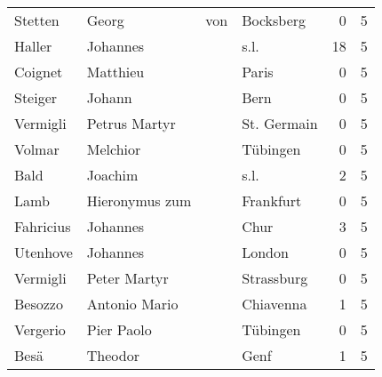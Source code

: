 \documentclass[10pt,a4paper,landscape]{article}
\begin{document}
\begin{longtable}{llllrr}
                  Stetten &                              Georg &         von &                                   Bocksberg &          0 &         5 \\
                   Haller &                           Johannes &             &                                        s.l. &         18 &         5 \\
                  Coignet &                           Matthieu &             &                                       Paris &          0 &         5 \\
                  Steiger &                             Johann &             &                                        Bern &          0 &         5 \\
                 Vermigli &                      Petrus Martyr &             &                                 St. Germain &          0 &         5 \\
                   Volmar &                           Melchior &             &                                    Tübingen &          0 &         5 \\
                     Bald &                            Joachim &             &                                        s.l. &          2 &         5 \\
                     Lamb &                     Hieronymus zum &             &                                   Frankfurt &          0 &         5 \\
                Fahricius &                           Johannes &             &                                        Chur &          3 &         5 \\
                 Utenhove &                           Johannes &             &                                      London &          0 &         5 \\
                 Vermigli &                       Peter Martyr &             &                                  Strassburg &          0 &         5 \\
                  Besozzo &                      Antonio Mario &             &                                   Chiavenna &          1 &         5 \\
                 Vergerio &                         Pier Paolo &             &                                    Tübingen &          0 &         5 \\
                     Besä &                            Theodor &             &                                        Genf &          1 &         5 \\

\end{longtable}
\end{document}
